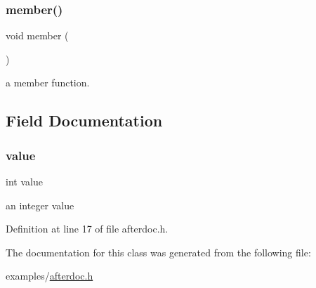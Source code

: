 \subsubsection{\texorpdfstring{member()}{member()}}
{\footnotesize\ttfamily void member (\begin{DoxyParamCaption}{ }\end{DoxyParamCaption})}



a member function. 



\subsection{Field Documentation}
\mbox{\label{class_afterdoc___test_ac4f474c82e82cbb89ca7c36dd52be0ed}} 
\subsubsection{\texorpdfstring{value}{value}}
{\footnotesize\ttfamily int value\hspace{0.3cm}{\ttfamily [protected]}}

an integer value 

Definition at line 17 of file afterdoc.\+h.



The documentation for this class was generated from the following file\+:\begin{DoxyCompactItemize}
\item 
examples/\hyperlink{afterdoc_8h}{afterdoc.\+h}\end{DoxyCompactItemize}
